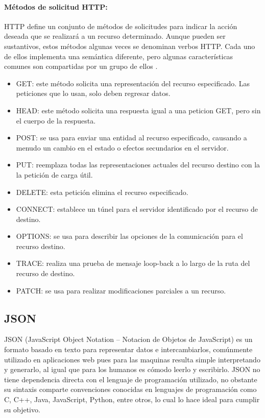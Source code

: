 \paragraph{Métodos de solicitud HTTP:}

HTTP define un conjunto de métodos de solicitudes para indicar la acción deseada que se realizará a un recurso determinado. Aunque pueden ser sustantivos, estos métodos algunas veces se denominan verbos HTTP. Cada uno de ellos implementa una semántica diferente, pero algunas características comunes son compartidas por un grupo de ellos \cite{HTTPM}.\\

\begin{itemize}
	\item GET: este método solicita una representación del recurso especificado. Las peticiones que lo usan, solo deben regresar datos.
	\item HEAD: este método solicita una respuesta igual a una peticion GET, pero sin el cuerpo de la respuesta.
	\item POST: se usa para enviar una entidad al recurso especificado, causando a menudo un cambio en el estado o efectos secundarios en el servidor.
	\item PUT: reemplaza todas las representaciones actuales del recurso destino con la la petición de carga útil.
	\item DELETE: esta petición elimina el recurso especificado.
	\item CONNECT: establece un túnel para el servidor identificado por el recurso de destino.
	\item OPTIONS: se usa para describir las opciones de la comunicación para el recurso destino.
	\item TRACE: realiza una prueba de mensaje loop-back a lo largo de la ruta del recurso de destino. 
	\item PATCH: se usa para realizar modificaciones parciales a un recurso.
\end{itemize}

\subsection{JSON}

JSON (JavaScript Object Notation – Notacion de Objetos de JavaScript) es un formato basado en texto para representar datos e intercambiarlos, comúnmente utilizado en aplicaciones web pues para las maquinas resulta simple interpretando y generarlo, al igual que para los humanos es cómodo leerlo y escribirlo. JSON no tiene dependencia directa con el lenguaje de programación utilizado, no obstante su sintaxis comparte convenciones conocidas en  lenguajes de programación como C, C++, Java, JavaScript, Python, entre otros, lo cual lo hace ideal para cumplir su objetivo. \\

